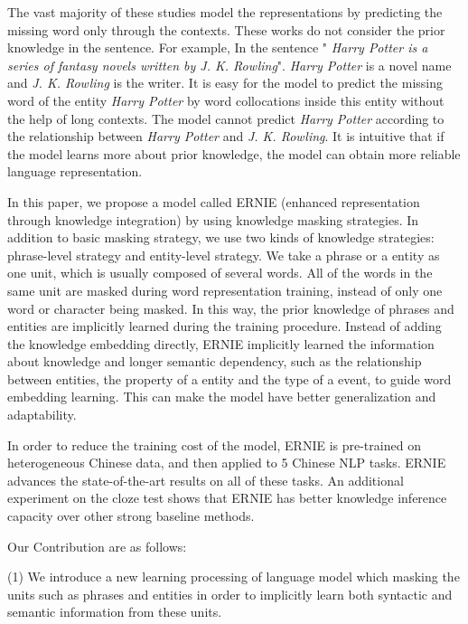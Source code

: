 \documentclass[11pt,a4paper]{article}
\begin{document}
The vast majority of these studies model the representations by predicting the missing word only through the contexts. These works do not consider the prior knowledge in the sentence.  
For example, In the sentence " \textit{Harry Potter is a series of fantasy novels written by J. K. Rowling}".\textit{ Harry Potter} is a novel name and  \textit{J. K. Rowling} is the writer. It is easy for the model  to predict the missing word of the entity \textit{ Harry Potter} by word collocations inside this entity without the help of long contexts. 
The model cannot predict \textit{ Harry Potter} according to the relationship between \textit{ Harry Potter} and \textit{J. K. Rowling}. 
It is intuitive that if the model learns more about prior knowledge, the model can obtain more reliable language representation.

In this paper, we propose a model called ERNIE (enhanced representation through knowledge integration) by using knowledge masking strategies. In addition to basic masking strategy, we use two kinds of knowledge strategies: phrase-level strategy and entity-level strategy. We take a phrase or a entity as one unit, which is usually composed of several words. All of the words in the same unit are masked during word representation training, instead of only one word or character being masked. In this way, the prior knowledge of phrases and entities are implicitly learned during the training procedure. 
Instead of adding the knowledge embedding directly, ERNIE implicitly learned the information about knowledge and longer semantic dependency, such as the relationship between entities, the property of a entity and the type of a event, to guide word embedding learning. This can make the model have better generalization and adaptability.



In order to reduce the training cost of the model, ERNIE is pre-trained on heterogeneous Chinese data, and then applied to 5 Chinese NLP tasks.
ERNIE advances the state-of-the-art results on all of these tasks. 
An additional experiment on the cloze test shows that ERNIE has better knowledge inference capacity over other strong baseline methods.

Our Contribution are as follows:

(1) We introduce a new learning processing of language model which masking the units such as phrases and entities in order to implicitly learn both syntactic and semantic information from these units.
\end{document}
